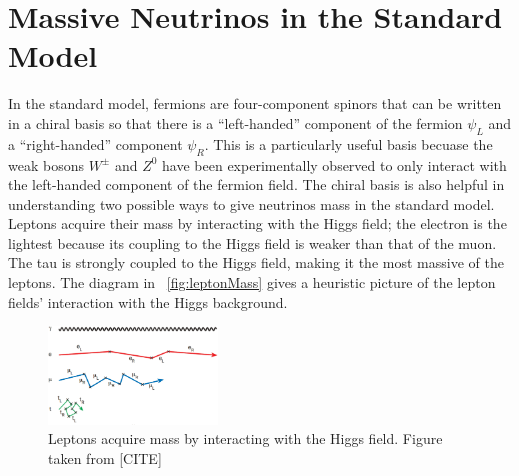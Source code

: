 \section{Massive Neutrinos in the Standard Model}
\label{sec:mVd}

In the standard model, fermions are four-component spinors that can be written in a chiral basis so that there is a ``left-handed'' component of the fermion $\psi_L$ and a ``right-handed'' component $\psi_R$.  This is a particularly useful basis becuase the weak bosons $W^{\pm}$ and $Z^0$ have been experimentally observed to only interact with the left-handed component of the fermion field.  The chiral basis is also helpful in understanding two possible ways to give neutrinos mass in the standard model.  Leptons acquire their mass by interacting with the Higgs field; the electron is the lightest because its coupling to the Higgs field is weaker than that of the muon.  The tau is strongly coupled to the Higgs field, making it the most massive of the leptons.  The diagram in {\fig}~\ref{fig:leptonMass} gives a heuristic picture of the lepton fields' interaction with the Higgs background.  
\begin{figure}[htp]
\centering
\includegraphics[width=0.4\textwidth]{figures/leptonMass.eps}
\caption{Leptons acquire mass by interacting with the Higgs field.  Figure taken from [CITE]}
\end{figure}
